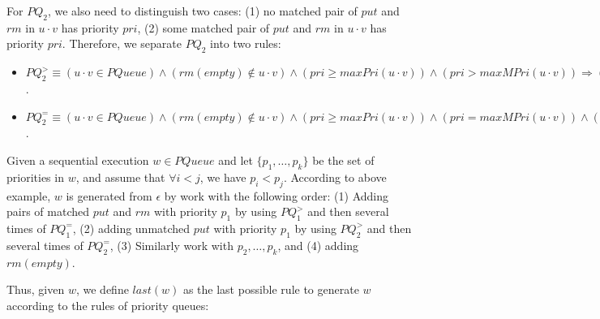 For $\textit{PQ}_2$, we also need to distinguish two cases: (1) no matched pair of $\textit{put}$ and $\textit{rm}$ in $u \cdot v$ has priority $\textit{pri}$, (2) some matched pair of $\textit{put}$ and $\textit{rm}$ in $u \cdot v$ has priority $\textit{pri}$. Therefore, we separate $\textit{PQ}_2$ into two rules:

\begin{itemize}
\setlength{\itemsep}{0.5pt}
\item[-] $\textit{PQ}_2^{>} \equiv (u \cdot v \in \textit{PQueue}) \wedge (\textit{rm}(\textit{empty}) \notin u \cdot v) \wedge (\textit{pri} \geq \textit{maxPri}(u \cdot v)) \wedge (\textit{pri} > \textit{maxMPri}(u \cdot v)) \Rightarrow (u \cdot \textit{put}(\textit{itm},\textit{pri}) \cdot v \in \textit{PQueue})$.

\item[-] $\textit{PQ}_2^{=} \equiv (u \cdot v \in \textit{PQueue}) \wedge (\textit{rm}(\textit{empty}) \notin u \cdot v) \wedge (\textit{pri} \geq \textit{maxPri}(u \cdot v)) \wedge (\textit{pri} = \textit{maxMPri}(u \cdot v)) \wedge (\textit{putInSeq}(u \cdot v,u,\textit{pri})) \wedge \Rightarrow (u \cdot \textit{put}(\textit{itm},\textit{pri}) \cdot v \in \textit{PQueue})$.
\end{itemize}


Given a sequential execution $w \in \textit{PQueue}$ and let $\{p_1,\ldots,p_k\}$ be the set of priorities in $w$, and assume that $\forall i<j$, we have $p_i < p_j$. According to above example, $w$ is generated from $\epsilon$ by work with the following order: (1) Adding pairs of matched $\textit{put}$ and $\textit{rm}$ with priority $p_1$ by using $\textit{PQ}_1^{>}$ and then several times of $\textit{PQ}_1^{=}$, (2) adding unmatched $\textit{put}$ with priority $p_1$ by using $\textit{PQ}_2^{>}$ and then several times of $\textit{PQ}_2^{=}$, (3) Similarly work with $p_2,\ldots,p_k$, and (4) adding $\textit{rm}(\textit{empty})$.

Thus, given $w$, we define $\textit{last}(w)$ as the last possible rule to generate $w$ according to the rules of priority queues:

